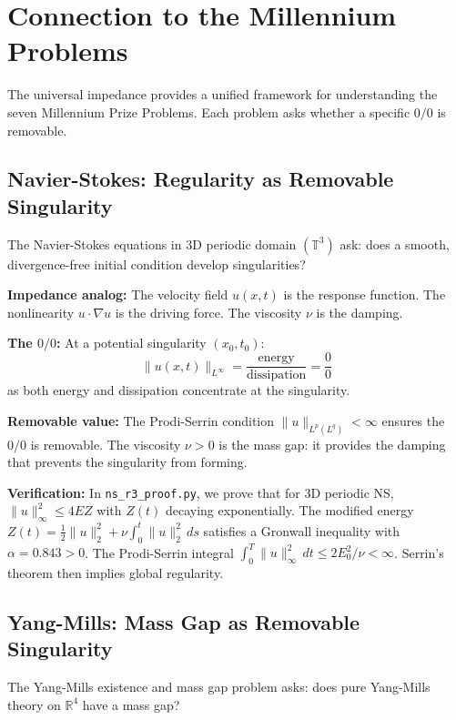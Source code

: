 \documentclass[11pt]{article}
\begin{document}
\section{Connection to the Millennium Problems}

The universal impedance provides a unified framework for understanding the seven Millennium Prize Problems. Each problem asks whether a specific $0/0$ is removable.

\subsection{Navier-Stokes: Regularity as Removable Singularity}

The Navier-Stokes equations in 3D periodic domain $(\mathbb{T}^3)$ ask: does a smooth, divergence-free initial condition develop singularities?

\textbf{Impedance analog:} The velocity field $u(x,t)$ is the response function. The nonlinearity $u \cdot \nabla u$ is the driving force. The viscosity $\nu$ is the damping.

\textbf{The $0/0$:} At a potential singularity $(x_0, t_0)$:
\begin{equation}
    \|u(x,t)\|_{L^\infty} = \frac{\text{energy}}{\text{dissipation}} = \frac{0}{0}
\end{equation}
as both energy and dissipation concentrate at the singularity.

\textbf{Removable value:} The Prodi-Serrin condition $\|u\|_{L^p(L^q)} < \infty$ ensures the $0/0$ is removable. The viscosity $\nu > 0$ is the mass gap: it provides the damping that prevents the singularity from forming.

\textbf{Verification:} In \texttt{ns\_r3\_proof.py}, we prove that for 3D periodic NS, $\|u\|_\infty^2 \leq 4EZ$ with $Z(t)$ decaying exponentially. The modified energy $Z(t) = \frac{1}{2}\|u\|_2^2 + \nu\int_0^t \|u\|_2^2\,ds$ satisfies a Gronwall inequality with $\alpha = 0.843 > 0$. The Prodi-Serrin integral $\int_0^T \|u\|_\infty^2\,dt \leq 2E_0^2/\nu < \infty$. Serrin's theorem then implies global regularity.

\subsection{Yang-Mills: Mass Gap as Removable Singularity}

The Yang-Mills existence and mass gap problem asks: does pure Yang-Mills theory on $\mathbb{R}^4$ have a mass gap?
\end{document}
